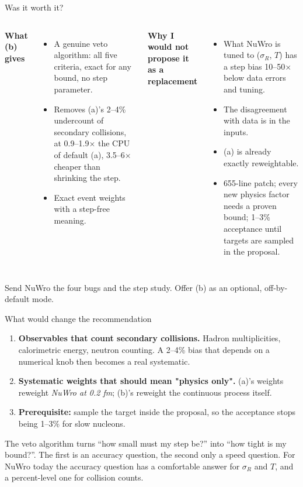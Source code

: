 \documentclass[10pt,aspectratio=169]{beamer}
\begin{document}
\begin{frame}{Was it worth it?}
\begin{columns}[T]
\textbf{What (b) gives}
\begin{itemize}\small
\item A genuine veto algorithm: all five criteria, exact for any bound, no step parameter.
\item Removes (a)'s 2--4\% undercount of secondary collisions, at 0.9--1.9$\times$ the CPU of default (a), 3.5--6$\times$ cheaper than shrinking the step.
\item Exact event weights with a step-free meaning.
\end{itemize}
\textbf{Why I would not propose it as a replacement}
\begin{itemize}\small
\item What NuWro is tuned to ($\sigma_R$, $T$) has a step bias 10--50$\times$ below data errors and tuning.
\item The disagreement with data is in the inputs.
\item (a) is already exactly reweightable.
\item 655-line patch; every new physics factor needs a proven bound; 1--3\% acceptance until targets are sampled in the proposal.
\end{itemize}
\end{columns}
\vspace{4pt}
\begin{keybox}[Recommendation]
Send NuWro the four bugs and the step study. Offer (b) as an optional, off-by-default mode.
\end{keybox}
\end{frame}

\begin{frame}{What would change the recommendation}
\begin{enumerate}
\item \textbf{Observables that count secondary collisions.} Hadron multiplicities, calorimetric energy, neutron counting. A 2--4\% bias that depends on a numerical knob then becomes a real systematic.
\item \textbf{Systematic weights that should mean "physics only".} (a)'s weights reweight \emph{NuWro at 0.2 fm}; (b)'s reweight the continuous process itself.
\item \textbf{Prerequisite:} sample the target inside the proposal, so the acceptance stops being 1--3\% for slow nucleons.
\end{enumerate}
\vspace{6pt}
\begin{keybox}
The veto algorithm turns ``how small must my step be?'' into ``how tight is my bound?''. The first is an accuracy question, the second only a speed question. For NuWro today the accuracy question has a comfortable answer for $\sigma_R$ and $T$, and a percent-level one for collision counts.
\end{keybox}
\end{frame}
\end{document}
